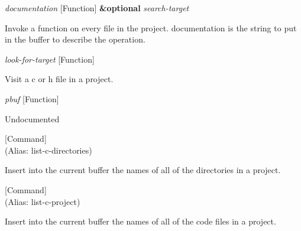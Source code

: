 \vspace{1em}
\noindent
{}
\usebox{\funcname}\emph{documentation}
 \hfill [Function]
\hspace*{\wd\funcname}\textbf{\&optional} \emph{search-target}
\hspace*{\wd\funcname}

\begin{doc-string}
Invoke a function on every file in the project.
documentation is the string to put in the buffer to describe the operation.
\end{doc-string}

\vspace{1em}
\noindent
{}
\usebox{\funcname}\emph{look-for-target}
 \hfill [Function]

\begin{doc-string}
Visit a c or h file in a project.
\end{doc-string}

\vspace{1em}
\noindent
{}
\usebox{\funcname}\emph{pbuf}
 \hfill [Function]

\begin{doc-string}
Undocumented
\end{doc-string}

\vspace{1em}
\noindent
{}
\usebox{\funcname}
 \hfill [Command]\\%
 (Alias: list-c-directories)

\begin{doc-string}
Insert into the current buffer the names of all of the directories in a project.
\end{doc-string}

\vspace{1em}
\noindent
{}
\usebox{\funcname}
 \hfill [Command]\\%
 (Alias: list-c-project)

\begin{doc-string}
Insert into the current buffer the names of all of the code files in a project.
\end{doc-string}

